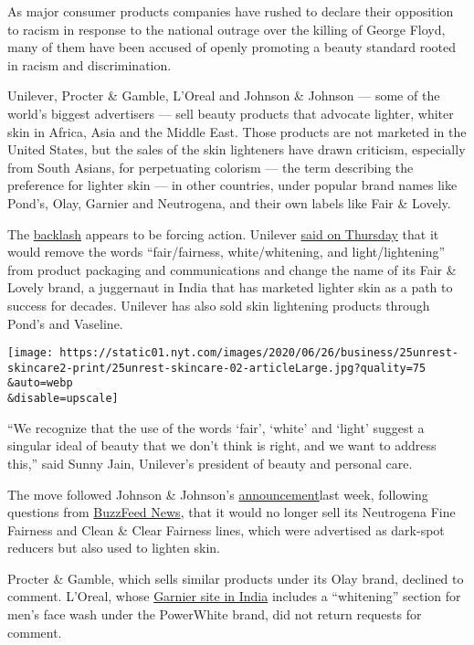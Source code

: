 As major consumer products companies have rushed to declare their
opposition to racism in response to the national outrage over the
killing of George Floyd, many of them have been accused of openly
promoting a beauty standard rooted in racism and discrimination.

Unilever, Procter \& Gamble, L'Oreal and Johnson \& Johnson --- some of
the world's biggest advertisers --- sell beauty products that advocate
lighter, whiter skin in Africa, Asia and the Middle East. Those products
are not marketed in the United States, but the sales of the skin
lighteners have drawn criticism, especially from South Asians, for
perpetuating colorism --- the term describing the preference for lighter
skin --- in other countries, under popular brand names like Pond's,
Olay, Garnier and Neutrogena, and their own labels like Fair \& Lovely.

The
\href{https://www.nytimes.com/2020/06/13/us/george-floyd-racism-america.html}{backlash}
appears to be forcing action. Unilever
\href{https://www.unilever.com/news/press-releases/2020/unilever-evolves-skin-care-portfolio-to-embrace-a-more-inclusive-vision-of-beauty.html}{said
on Thursday} that it would remove the words ``fair/fairness,
white/whitening, and light/lightening'' from product packaging and
communications and change the name of its Fair \& Lovely brand, a
juggernaut in India that has marketed lighter skin as a path to success
for decades. Unilever has also sold skin lightening products through
Pond's and Vaseline.

\texttt{[image: https://static01.nyt.com/images/2020/06/26/business/25unrest-skincare2-print/25unrest-skincare-02-articleLarge.jpg?quality=75\\\&auto=webp\\\&disable=upscale]}

``We recognize that the use of the words `fair', `white' and `light'
suggest a singular ideal of beauty that we don't think is right, and we
want to address this,'' said Sunny Jain, Unilever's president of beauty
and personal care.

The move followed Johnson \& Johnson's
\href{https://www.nytimes.com/2020/06/19/business/johnson-and-johnson-skin-whitening-cream.html}{announcement}last
week, following questions from
\href{https://www.buzzfeednews.com/article/meghara/skin-lightening-cream-black-lives-matter-companies}{BuzzFeed
News}, that it would no longer sell its Neutrogena Fine Fairness and
Clean \& Clear Fairness lines, which were advertised as dark-spot
reducers but also used to lighten skin.

Procter \& Gamble, which sells similar products under its Olay brand,
declined to comment. L'Oreal, whose
\href{https://www.garnier.in/shop-products/whitening}{Garnier site in
India} includes a ``whitening'' section for men's face wash under the
PowerWhite brand, did not return requests for comment.

